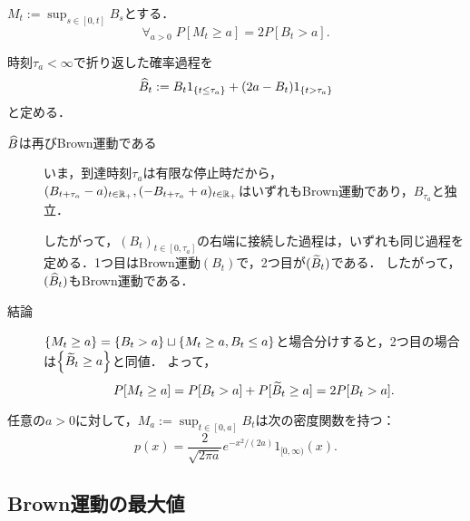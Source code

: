 \documentclass[uplatex,dvipdfmx]{jsreport}
\begin{document}
\begin{theorem}
    $M_t:=\sup_{s\in[0,t]}B_s$とする．
    \[\forall_{a>0}\;P[M_t\ge a]=2P[B_t>a].\]
\end{theorem}
\begin{Proof}
    時刻$\tau_a<\infty$で折り返した確率過程を
    \[\widehat{B}_t:=B_t1_{\left\{t\le\tau_a\right\}}+(2a-B_t)1_{\left\{t>\tau_a\right\}}\]
    と定める．
    \begin{description}
        \item[$\widehat{B}$は再びBrown運動である] いま，到達時刻$\tau_a$は有限な停止時だから，$(B_{t+\tau_a}-a)_{t\in\mathbb{R}_+},(-B_{t+\tau_a}+a)_{t\in\mathbb{R}_+}$はいずれもBrown運動であり，$B_{\tau_a}$と独立．
        
        したがって，$(B_t)_{t\in[0,\tau_a]}$の右端に接続した過程は，いずれも同じ過程を定める．1つ目はBrown運動$(B_t)$で，2つ目が$(\widetilde{B}_t)$である．
        したがって，$(\widehat{B}_t)$もBrown運動である．
        \item[結論]
        $\{M_t\ge a\}=\left\{B_t>a\right\}\sqcup\left\{M_t\ge a,B_t\le a\right\}$と場合分けすると，2つ目の場合は$\left\{\widetilde{B}_t\ge a\right\}$と同値．
        よって，
        \[P[M_t\ge a]=P[B_t>a]+P[\widetilde{B}_t\ge a]=2P[B_t>a].\]
    \end{description}
\end{Proof}

\begin{corollary}\label{cor-density-of-sup-process-of-Brownian-motion}
    任意の$a>0$に対して，$M_a:=\sup_{t\in[0,a]}B_t$は次の密度関数を持つ：
    \[p(x)=\frac{2}{\sqrt{2\pi a}}e^{-x^2/(2a)}1_{[0,\infty)}(x).\]
\end{corollary}

\subsection{Brown運動の最大値}
\end{document}
